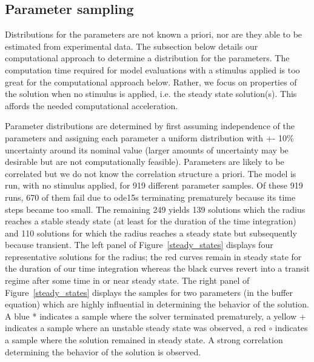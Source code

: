 \documentclass[12pt]{article}
\numberwithin{equation}{section}
\begin{document}
\subsection{Parameter sampling}
\label{sec:param_sampling}
Distributions for the parameters are not known a priori, nor are they able to be estimated from experimental data. The subsection below details our computational approach to determine a distribution for the parameters. The computation time required for model evaluations with a stimulus applied is too great for the computational approach below. Rather, we focus on properties of the solution when no stimulus is applied, i.e. the steady state solution(s). This affords the needed computational acceleration. 

Parameter distributions are determined by first assuming independence of the parameters and assigning each parameter a uniform distribution with +- 10\% uncertainty around its nominal value (larger amounts of uncertainty may be desirable but are not computationally feasible). Parameters are likely to be correlated but we do not know the correlation structure a priori. The model is run, with no stimulus applied, for 919 different parameter samples. Of these 919 runs, 670 of them fail due to ode15s terminating prematurely because its time steps became too small. The remaining 249 yields 139 solutions which the radius reaches a stable steady state (at least for the duration of the time integration) and 110 solutions for which the radius reaches a steady state but subsequently because transient. The left panel of Figure~\ref{steady_states} displays four representative solutions for the radius; the red curves remain in steady state for the duration of our time integration whereas the black curves revert into a transit regime after some time in or near steady state. The right panel of Figure~\ref{steady_states} displays the samples for two parameters (in the buffer equation) which are highly influential in determining the behavior of the solution. A blue * indicates a sample where the solver terminated prematurely, a yellow + indicates a sample where an unstable steady state was observed, a red $\circ$ indicates a sample where the solution remained in steady state. A strong correlation determining the behavior of the solution is observed.
\end{document}
